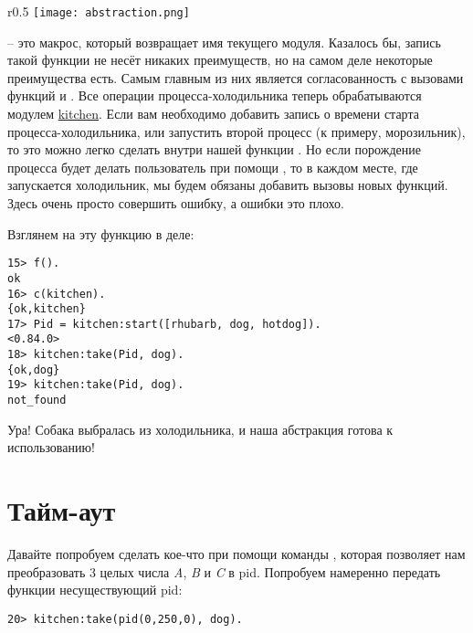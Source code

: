 \begin{wrapfigure}{r}{0.5\linewidth}
    \texttt{[image: abstraction.png]}
\end{wrapfigure}
 \--- это макрос, который возвращает имя текущего модуля.
Казалось бы, запись такой функции не несёт никаких преимуществ, но на самом деле некоторые преимущества есть.
Самым главным из них является согласованность с вызовами функций  и .
Все операции процесса\--холодильника теперь обрабатываются модулем \href{http://learnyousomeerlang.com/static/erlang/kitchen.erl}{kitchen}.
Если вам необходимо добавить запись о времени старта процесса\--холодильника, или запустить второй процесс (к примеру, морозильник), то это можно легко сделать внутри нашей функции .
Но если порождение процесса будет делать пользователь при помощи , то в каждом месте, где запускается холодильник, мы будем обязаны добавить вызовы новых функций.
Здесь очень просто совершить ошибку, а ошибки это плохо.

Взглянем на эту функцию в деле:
\begin{lstlisting}[style=erlang]
15> f().
ok
16> c(kitchen).
{ok,kitchen}
17> Pid = kitchen:start([rhubarb, dog, hotdog]).
<0.84.0>
18> kitchen:take(Pid, dog).
{ok,dog}
19> kitchen:take(Pid, dog).
not_found
\end{lstlisting}

Ура!
Собака выбралась из холодильника, и наша абстракция готова к использованию!
\section{Тайм\--аут}
\label{time-out}
Давайте попробуем сделать кое\--что при помощи команды , которая позволяет нам преобразовать 3 целых числа \emph{A}, \emph{B} и \emph{C} в pid.
Попробуем намеренно передать функции  несуществующий pid:
\begin{lstlisting}[style=erlang]
20> kitchen:take(pid(0,250,0), dog).
\end{lstlisting}

